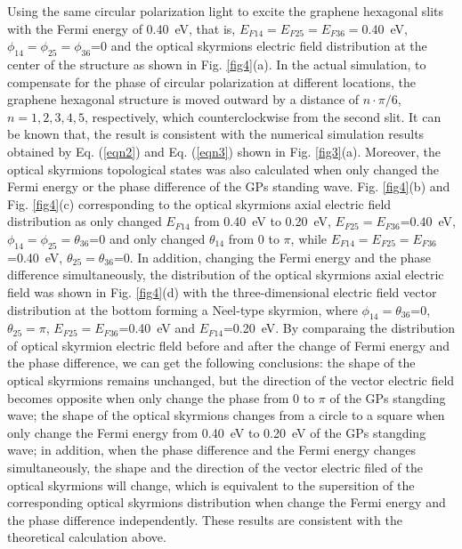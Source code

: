 \documentclass{optica-article}
\begin{document}
Using the same circular polarization light to excite the graphene hexagonal slits with the Fermi energy of 0.40~eV, that is, $E_{F14}=E_{F25}=E_{F36}=$0.40~eV, $\phi_{14}=\phi_{25}=\phi_{36}$=0 and the optical skyrmions electric field distribution at the center of the structure as shown in Fig. \ref{fig4}(a). In the actual simulation, to compensate for the phase of circular polarization at different locations, the graphene hexagonal structure is moved outward by a distance of $n\cdot\pi/6$, $n=1, 2, 3, 4, 5$, respectively, which counterclockwise from the second slit. It can be known that, the result is consistent with the numerical simulation results obtained by Eq. (\ref{eqn2}) and Eq. (\ref{eqn3}) shown in Fig. \ref{fig3}(a). Moreover, the optical skyrmions topological states was also calculated when only changed the Fermi energy or the phase difference of the GPs standing wave. Fig. \ref{fig4}(b) and Fig. \ref{fig4}(c) corresponding to the optical skyrmions axial electric field distribution as only changed $E_{F14}$ from 0.40~eV to 0.20~eV, $E_{F25}=E_{F36}$=0.40~eV, $\phi_{14}=\phi_{25}=\theta_{36}$=0 and only changed $\theta_{14}$ from 0 to $\pi$, while $E_{F14}=E_{F25}=E_{F36}$=0.40~eV, $\theta_{25}=\theta_{36}$=0. In addition, changing the Fermi energy and the phase difference simultaneously, the distribution of the optical skyrmions axial electric field was shown in Fig. \ref{fig4}(d) with the three-dimensional electric field vector distribution at the bottom forming a N$\acute{\text{e}}$el-type skyrmion, where $\phi_{14}=\theta_{36}$=0, $\theta_{25}=\pi$, $E_{F25}=E_{F36}$=0.40~eV and $E_{F14}$=0.20~eV. By comparaing the distribution of optical skyrmion electric fleld before and after the change of Fermi energy and the phase difference, we can get the following conclusions: the shape of the optical skyrmions remains unchanged, but the direction of the vector electric field becomes opposite when only change the phase from 0 to $\pi$ of the GPs stangding wave; the shape of the optical skyrmions changes from a circle to a square when only change the Fermi energy from 0.40~eV to 0.20~eV of the GPs stangding wave; in addition, when the phase difference and the Fermi energy changes simultaneously, the shape and the direction of the vector electric filed of the optical skyrmions will change, which is equivalent to the supersition of the corresponding optical skyrmions distribution when change the Fermi energy and the phase difference independently. These results are consistent with the theoretical calculation above. 
\end{document}
